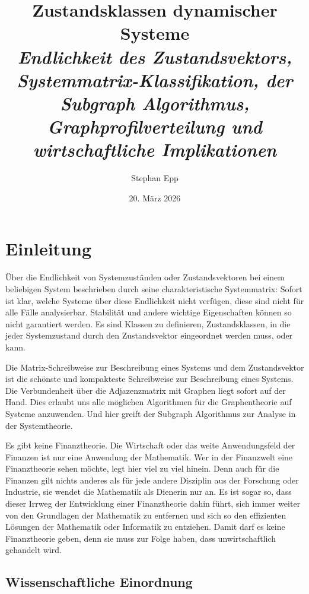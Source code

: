 ﻿\documentclass[12pt, a4paper, titlepage]{report}
\title{\textbf{Zustandsklassen dynamischer Systeme}\\
  {\Large\itshape Endlichkeit des Zustandsvektors, Systemmatrix-Klassifikation,
   der Subgraph Algorithmus, Graphprofilverteilung und wirtschaftliche Implikationen}}
\author{Stephan Epp}
\date{20. März 2026}
\theoremstyle{definition}
\theoremstyle{remark}
\begin{document}

\maketitle
\tableofcontents
\newpage

\chapter{Einleitung}

Über die Endlichkeit von Systemzuständen oder Zustandsvektoren bei einem beliebigen
System beschrieben durch seine charakteristische Systemmatrix: Sofort ist klar, welche Systeme
über diese Endlichkeit nicht verfügen, diese sind nicht für alle Fälle analysierbar. Stabilität
und andere wichtige Eigenschaften können so nicht garantiert werden. Es sind Klassen zu
definieren, Zustandsklassen, in die jeder Systemzustand durch den Zustandsvektor
eingeordnet werden muss, oder kann.

Die Matrix-Schreibweise zur Beschreibung eines Systems und dem Zustandsvektor ist die
schönste und kompakteste Schreibweise zur Beschreibung eines Systems. Die Verbundenheit
über die Adjazenzmatrix mit Graphen liegt sofort auf der Hand. Dies erlaubt uns alle
möglichen Algorithmen für die Graphentheorie auf Systeme anzuwenden. Und hier greift der
Subgraph Algorithmus zur Analyse in der Systemtheorie.

Es gibt keine Finanztheorie. Die Wirtschaft oder das weite Anwendungsfeld der Finanzen
ist nur eine Anwendung der Mathematik. Wer in der Finanzwelt eine Finanztheorie sehen
möchte, legt hier viel zu viel hinein. Denn auch für die Finanzen gilt nichts anderes
als für jede andere Disziplin aus der Forschung oder Industrie, sie wendet
die Mathematik als Dienerin nur an. Es ist sogar so, dass dieser Irrweg der Entwicklung
einer Finanztheorie dahin führt, sich immer weiter von den Grundlagen der Mathematik zu
entfernen und sich so den effizienten Lösungen der Mathematik oder Informatik zu
entziehen. Damit darf es keine Finanztheorie geben, denn sie muss zur Folge haben, dass
unwirtschaftlich gehandelt wird.

\section{Wissenschaftliche Einordnung}
\end{document}
